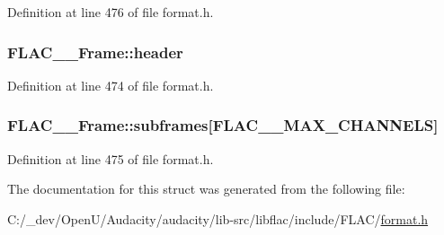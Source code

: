 Definition at line 476 of file format.\+h.

\subsubsection[{\texorpdfstring{header}{header}}]{ F\+L\+A\+C\+\_\+\+\_\+\+Frame\+::header}\hypertarget{struct_f_l_a_c_____frame_ae39796592bb27512110976fe7b80ce06}{}\label{struct_f_l_a_c_____frame_ae39796592bb27512110976fe7b80ce06}


Definition at line 474 of file format.\+h.

\subsubsection[{\texorpdfstring{subframes}{subframes}}]{ F\+L\+A\+C\+\_\+\+\_\+\+Frame\+::subframes\mbox{[}{\bf F\+L\+A\+C\+\_\+\+\_\+\+M\+A\+X\+\_\+\+C\+H\+A\+N\+N\+E\+LS}\mbox{]}}\hypertarget{struct_f_l_a_c_____frame_a526e3e6173e7a6db752e7a44bff3e91d}{}\label{struct_f_l_a_c_____frame_a526e3e6173e7a6db752e7a44bff3e91d}


Definition at line 475 of file format.\+h.



The documentation for this struct was generated from the following file\+:\begin{DoxyCompactItemize}
\item 
C\+:/\+\_\+dev/\+Open\+U/\+Audacity/audacity/lib-\/src/libflac/include/\+F\+L\+A\+C/\hyperlink{include_2_f_l_a_c_2format_8h}{format.\+h}\end{DoxyCompactItemize}
